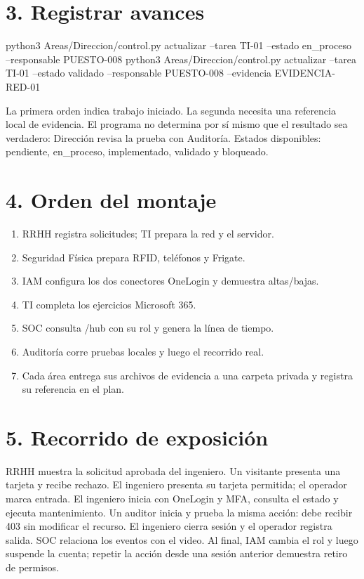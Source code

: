\documentclass[12pt,a4paper]{article}
\begin{document}
\section*{3. Registrar avances}
\begin{Comandos}
python3 Areas/Direccion/control.py actualizar --tarea TI-01 --estado en_proceso --responsable PUESTO-008
python3 Areas/Direccion/control.py actualizar --tarea TI-01 --estado validado --responsable PUESTO-008 --evidencia EVIDENCIA-RED-01
\end{Comandos}
La primera orden indica trabajo iniciado. La segunda necesita una referencia local de evidencia. El programa no determina por sí mismo que el resultado sea verdadero: Dirección revisa la prueba con Auditoría. Estados disponibles: pendiente, en\_proceso, implementado, validado y bloqueado.\par
{}\section*{4. Orden del montaje}
\begin{enumerate}
\item RRHH registra solicitudes; TI prepara la red y el servidor.
\item Seguridad Física prepara RFID, teléfonos y Frigate.
\item IAM configura los dos conectores OneLogin y demuestra altas/bajas.
\item TI completa los ejercicios Microsoft 365.
\item SOC consulta \textnormal{/\allowbreak{}hub} con su rol y genera la línea de tiempo.
\item Auditoría corre pruebas locales y luego el recorrido real.
\item Cada área entrega sus archivos de evidencia a una carpeta privada y registra su referencia en el plan.
\end{enumerate}
\section*{5. Recorrido de exposición}
RRHH muestra la solicitud aprobada del ingeniero. Un visitante presenta una tarjeta y recibe rechazo. El ingeniero presenta su tarjeta permitida; el operador marca entrada. El ingeniero inicia con OneLogin y MFA, consulta el estado y ejecuta mantenimiento. Un auditor inicia y prueba la misma acción: debe recibir 403 sin modificar el recurso. El ingeniero cierra sesión y el operador registra salida. SOC relaciona los eventos con el video. Al final, IAM cambia el rol y luego suspende la cuenta; repetir la acción desde una sesión anterior demuestra retiro de permisos.\par
\end{document}

